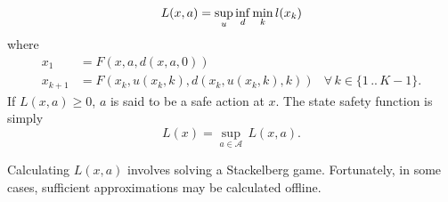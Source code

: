 \documentclass{article}
\newcommand{\aspace}{\ensuremath{\mathcal{A}} }
\begin{document}
\begin{equation}
    L(x, a) = \underset{u}{\sup}\,\underset{d}{\inf}\,\underset{k}{\min}\,l(x_k) \\
\end{equation}
where
\begin{equation*}
    \begin{aligned}
        x_1 &= F(x, a, d(x, a, 0)) \\
        x_{k+1} &= F(x_k, u(x_k, k), d(x_k, u(x_k, k), k)) & \forall\, k \in \{1\,..\,K-1\} \text{.}
    \end{aligned}
\end{equation*}
If $L(x, a) \geq 0$, $a$ is said to be a safe action at $x$. The state safety function is simply
\begin{equation}
    L(x) = \underset{a\in\aspace}{\sup}\,L(x,a) \text{.}
\end{equation}

Calculating $L(x,a)$ involves solving a Stackelberg game. Fortunately, in some cases, sufficient approximations may be calculated offline.

% 
% 


\end{document}
